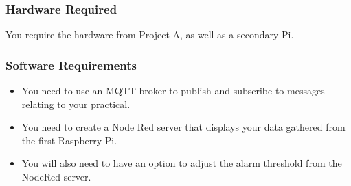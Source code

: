 \subsubsection{Hardware Required}
You require the hardware from Project A, as well as a secondary Pi.

\subsubsection{Software Requirements}
\begin{itemize}
    \item You need to use an MQTT broker to publish and subscribe to messages relating to your practical. 
    \item You need to create a Node Red server that displays your data gathered from the first Raspberry Pi. 
    \item You will also need to have an option to adjust the alarm threshold from the NodeRed server.
\end{itemize}

